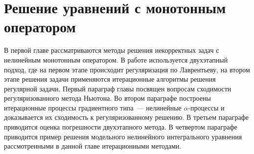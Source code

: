 \chapter{Решение уравнений с монотонным оператором}
В первой главе рассматриваются методы решения некорректных задач с нелинейным монотонным оператором. В работе используется двухэтапный подход, где на первом этапе происходит регуляризация по Лаврентьеву, на втором этапе решения задачи применяются итерационные алгоритмы решения регулярной задачи. Первый параграф главы посвящен вопросам сходимости регуляризованного метода Ньютона. Во втором параграфе построены итерационные процессы градиентного типа~--- нелинейные $\alpha$-процессы и доказывается их сходимость к регуляризованному решению. В третьем параграфе приводится оценка погрешности двухэтапного метода. В четвертом параграфе приводится пример решения модельного нелинейного интегрального уравнения рассмотренными в данной главе итерационными методами.

\newpage

